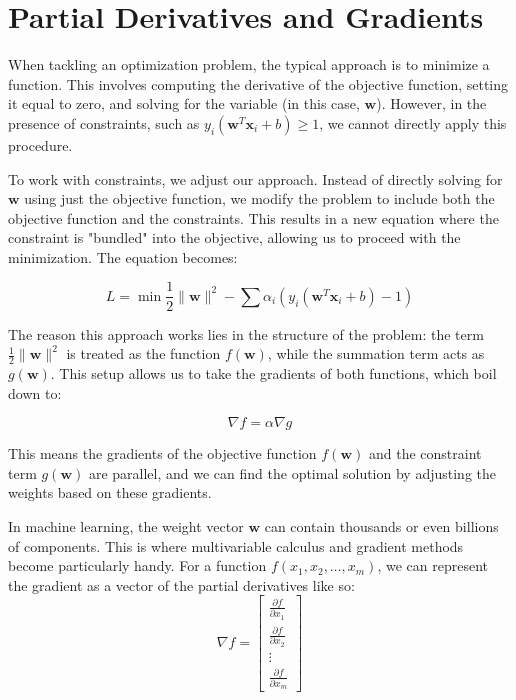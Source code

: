 \section{Partial Derivatives and Gradients}

When tackling an optimization problem, the typical approach is to minimize a function. This involves computing the derivative of the objective function, setting it equal to zero, and solving for the variable (in this case, \( \mathbf{w} \)). However, in the presence of constraints, such as \( y_i (\mathbf{w}^T \mathbf{x}_i + b) \geq 1 \), we cannot directly apply this procedure. 

To work with constraints, we adjust our approach. Instead of directly solving for \( \mathbf{w} \) using just the objective function, we modify the problem to include both the objective function and the constraints. This results in a new equation where the constraint is "bundled" into the objective, allowing us to proceed with the minimization. The equation becomes:

\[
L = \min \frac{1}{2} \| \mathbf{w} \|^2 - \sum \alpha_i \left( y_i (\mathbf{w}^T \mathbf{x}_i + b) - 1 \right)
\]

The reason this approach works lies in the structure of the problem: the term \( \frac{1}{2} \| \mathbf{w} \|^2 \) is treated as the function \( f(\mathbf{w}) \), while the summation term acts as \( g(\mathbf{w}) \). This setup allows us to take the gradients of both functions, which boil down to:

\[
\nabla f = \alpha \nabla g
\]

This means the gradients of the objective function \( f(\mathbf{w}) \) and the constraint term \( g(\mathbf{w}) \) are parallel, and we can find the optimal solution by adjusting the weights based on these gradients.

In machine learning, the weight vector \( \mathbf{w} \) can contain thousands or even billions of components. This is where multivariable calculus and gradient methods become particularly handy. For a function \( f(x_1, x_2, \dots, x_m) \), we can represent the gradient as a vector of the partial derivatives like so:
\[
\nabla f = \begin{bmatrix}
\frac{\partial f}{\partial x_1} \\
\frac{\partial f}{\partial x_2} \\
\vdots \\
\frac{\partial f}{\partial x_m}
\end{bmatrix}
\]

